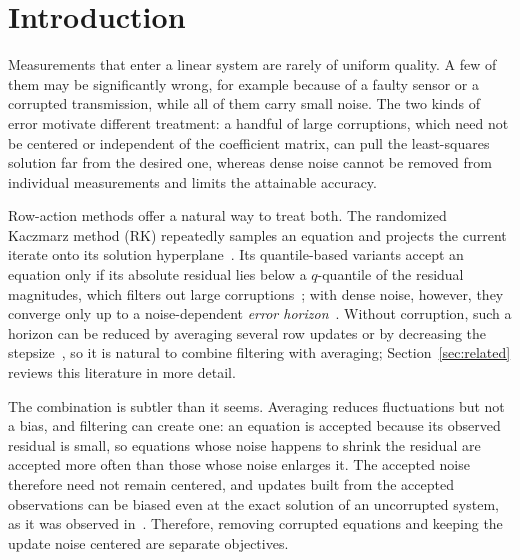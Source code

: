 \documentclass[pdflatex,sn-mathphys-num]{sn-jnl}
\theoremstyle{thmstyleone}
\theoremstyle{thmstylethree}
\begin{document}
\maketitle


\section{Introduction}
\label{sec:intro}

Measurements that enter a linear system are rarely of uniform quality. A few of
them may be significantly wrong, for example because of a faulty sensor or a
corrupted transmission, while all of them carry small noise. The two kinds of
error motivate different treatment: a handful of large corruptions, which need
not be centered or independent of the coefficient matrix, can pull the
least-squares solution far from the desired one, whereas dense noise cannot be
removed from individual measurements and limits the attainable accuracy.

Row-action methods offer a natural way to treat both. The randomized Kaczmarz
method (RK) repeatedly samples an equation and projects the current iterate
onto its solution hyperplane~\cite{kaczmarz1973,strohmer2007randomized}. Its
quantile-based variants accept an equation only if its absolute residual lies
below a $q$-quantile of the residual magnitudes, which filters out large
corruptions~\cite{haddock2022quantilebased,steinerberger2021quantile}; with
dense noise, however, they converge only up to a noise-dependent \emph{error
horizon}~\cite{jarman2021quantilerk,battaglia2025qrkdoublequantilerkerror,coria2024quantile}.
Without corruption, such a horizon can be reduced by averaging several row
updates or by decreasing the
stepsize~\cite{moorman2021randomized,marshall2022optimal,tondji2023adaptive,tondji2026accelerated},
so it is natural to combine filtering with averaging; Section~\ref{sec:related}
reviews this literature in more detail.

The combination is subtler than it seems. Averaging reduces fluctuations but
not a bias, and filtering can create one: an equation is accepted because its
observed residual is small, so equations whose noise happens to shrink the
residual are accepted more often than those whose noise enlarges it. The
accepted noise therefore need not remain centered, and updates built from the
accepted observations can be biased even at the exact solution of an
uncorrupted system, as it was observed in~\cite{shen2019learning,koloskova2023revisiting}. Therefore, removing
corrupted equations and keeping the update noise centered are separate
objectives.
\end{document}
